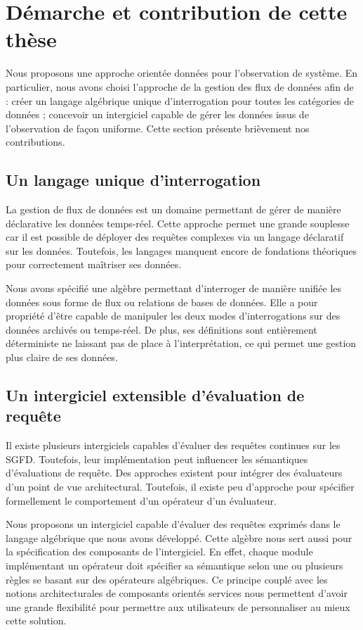\section{Démarche et contribution de cette thèse}\label{sec:intro:demarche}
Nous proposons une approche orientée données pour l'observation de système. En particulier, nous avons choisi l'approche de la gestion des flux de données afin de : créer un langage algébrique unique d'interrogation pour toutes les catégories de données ; concevoir un intergiciel capable de gérer les données issus de l'observation de façon uniforme. Cette section présente brièvement nos contributions.

\subsection{Un langage unique d'interrogation}
La gestion de flux de données est un domaine permettant de gérer de manière déclarative les données temps-réel. Cette approche permet une grande souplesse car il est possible de déployer des requêtes complexes via un langage déclaratif sur les données. Toutefois, les langages manquent encore de fondations théoriques pour correctement maîtriser ses données.

Nous avons spécifié une algèbre permettant d'interroger de manière unifiée les données sous forme de flux ou relations de bases de données. Elle a pour propriété d'être capable de manipuler les deux modes d'interrogations sur des données archivés ou temps-réel. De plus, ses définitions sont entièrement déterministe ne laissant pas de place à l'interprétation, ce qui permet une gestion plus claire de ses données.

\subsection{Un intergiciel extensible d'évaluation de requête}
Il existe plusieurs intergiciels capables d'évaluer des requêtes continues sur les SGFD. Toutefois, leur implémentation peut influencer les sémantiques d'évaluations de requête. Des approches existent pour intégrer des évaluateurs d'un point de vue architectural. Toutefois, il existe peu d'approche pour spécifier formellement le comportement d'un opérateur d'un évaluateur.

Nous proposons un intergiciel capable d'évaluer des requêtes exprimés dans le langage algébrique que nous avons développé. Cette algèbre nous sert aussi pour la spécification des composants de l'intergiciel. En effet, chaque module implémentant un opérateur doit spécifier sa sémantique selon une ou plusieurs règles se basant sur des opérateurs algébriques. Ce principe couplé avec les notions architecturales de composants orientés services nous permettent d'avoir une grande flexibilité pour permettre aux utilisateurs de personnaliser au mieux cette solution.

